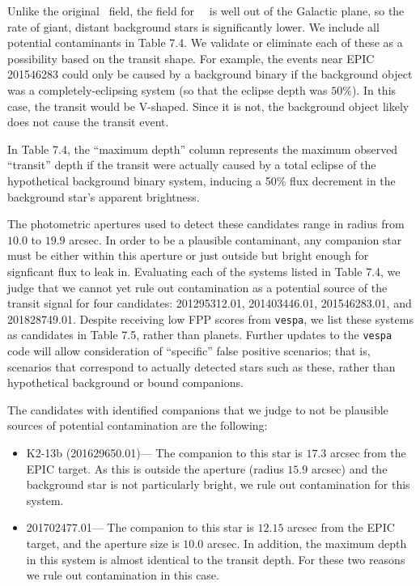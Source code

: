 Unlike the original \kep\ field, the field for \KT\ \Ci\ is
well out of the Galactic plane, so the rate of giant, distant background
stars is significantly lower.
We include all potential contaminants in Table 7.4.
We validate or eliminate each of these as a possibility based on the transit shape.
For example, the events near EPIC 201546283 could only be caused by a
background binary if the background object was a completely-eclipsing system
(so that the eclipse depth was $50\%$).
In this case, the transit would be V-shaped.
Since it is not, the background object likely does not cause
the transit event.


In Table 7.4, the ``maximum depth'' column represents
the maximum observed ``transit'' depth if the transit were actually caused
by a total eclipse of the hypothetical background binary system, inducing
a 50\% flux decrement in the background star's apparent brightness.

The photometric apertures used to detect these candidates range in radius from
$10.0$ to $19.9$ arcsec.  In order to be a plausible contaminant,
any companion star must
be either within this aperture or just outside but bright
enough for signficant flux to leak in.
Evaluating each of the systems listed in Table 7.4, we judge that we cannot yet
rule out contamination as a potential source of the transit signal for four
candidates: 201295312.01, 201403446.01, 201546283.01, and 201828749.01.
Despite receiving
low FPP scores from \texttt{vespa}, we list these systems as candidates in
Table 7.5, rather than planets.  Further updates to the \texttt{vespa} code
will allow consideration of ``specific'' false positive scenarios; that is,
scenarios that correspond to actually detected stars such as these, rather than
hypothetical background or bound companions.

The candidates with identified companions that we judge to not be plausible
sources of potential contamination are the following:
\begin{itemize}


\item K2-13b (201629650.01)--- The companion to this star is $17.3$ arcsec from
the EPIC target.  As this is outside the aperture
(radius $15.9$ arcsec) and the background star is not particularly bright,
we rule out contamination for this system.

\item 201702477.01--- The companion to this star is $12.15$ arcsec from the
EPIC target, and the aperture size is $10.0$ arcsec.  In addition,
the maximum depth in this system is almost identical to the transit depth.
For these two reasons we rule out contamination in this case.

\end{itemize}

